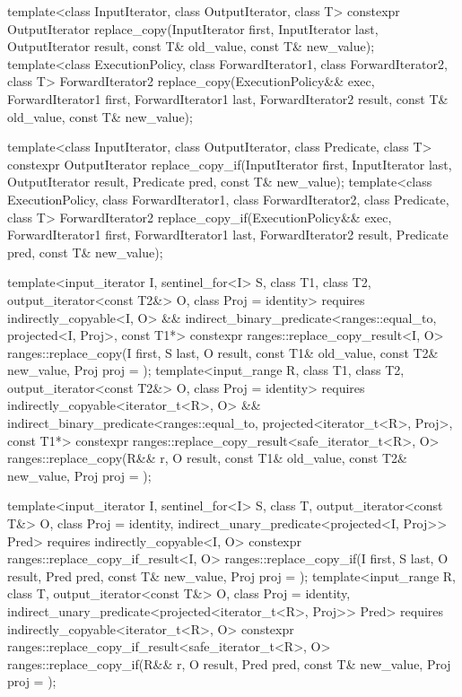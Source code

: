 %
%
\begin{itemdecl}
template<class InputIterator, class OutputIterator, class T>
  constexpr OutputIterator
    replace_copy(InputIterator first, InputIterator last,
                 OutputIterator result,
                 const T& old_value, const T& new_value);
template<class ExecutionPolicy, class ForwardIterator1, class ForwardIterator2, class T>
  ForwardIterator2
    replace_copy(ExecutionPolicy&& exec,
                 ForwardIterator1 first, ForwardIterator1 last,
                 ForwardIterator2 result,
                 const T& old_value, const T& new_value);

template<class InputIterator, class OutputIterator, class Predicate, class T>
  constexpr OutputIterator
    replace_copy_if(InputIterator first, InputIterator last,
                    OutputIterator result,
                    Predicate pred, const T& new_value);
template<class ExecutionPolicy, class ForwardIterator1, class ForwardIterator2,
         class Predicate, class T>
  ForwardIterator2
    replace_copy_if(ExecutionPolicy&& exec,
                    ForwardIterator1 first, ForwardIterator1 last,
                    ForwardIterator2 result,
                    Predicate pred, const T& new_value);

template<input_iterator I, sentinel_for<I> S, class T1, class T2, output_iterator<const T2&> O,
         class Proj = identity>
  requires indirectly_copyable<I, O> &&
           indirect_binary_predicate<ranges::equal_to, projected<I, Proj>, const T1*>
  constexpr ranges::replace_copy_result<I, O>
    ranges::replace_copy(I first, S last, O result, const T1& old_value, const T2& new_value,
                         Proj proj = {});
template<input_range R, class T1, class T2, output_iterator<const T2&> O,
         class Proj = identity>
  requires indirectly_copyable<iterator_t<R>, O> &&
           indirect_binary_predicate<ranges::equal_to, projected<iterator_t<R>, Proj>, const T1*>
  constexpr ranges::replace_copy_result<safe_iterator_t<R>, O>
    ranges::replace_copy(R&& r, O result, const T1& old_value, const T2& new_value,
                         Proj proj = {});

template<input_iterator I, sentinel_for<I> S, class T, output_iterator<const T&> O,
         class Proj = identity, indirect_unary_predicate<projected<I, Proj>> Pred>
  requires indirectly_copyable<I, O>
  constexpr ranges::replace_copy_if_result<I, O>
    ranges::replace_copy_if(I first, S last, O result, Pred pred, const T& new_value,
                            Proj proj = {});
template<input_range R, class T, output_iterator<const T&> O, class Proj = identity,
         indirect_unary_predicate<projected<iterator_t<R>, Proj>> Pred>
  requires indirectly_copyable<iterator_t<R>, O>
  constexpr ranges::replace_copy_if_result<safe_iterator_t<R>, O>
    ranges::replace_copy_if(R&& r, O result, Pred pred, const T& new_value,
                            Proj proj = {});
\end{itemdecl}

